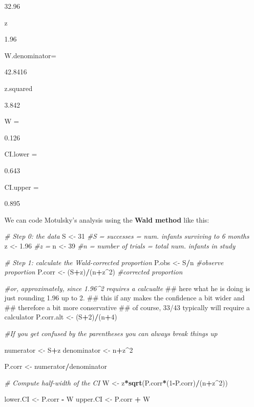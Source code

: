 \documentclass[]{book}
\newenvironment{Shaded}{\begin{snugshade}}{\end{snugshade}}
\newcommand{\KeywordTok}[1]{\textcolor[rgb]{0.13,0.29,0.53}{\textbf{#1}}}
\newcommand{\DecValTok}[1]{\textcolor[rgb]{0.00,0.00,0.81}{#1}}
\newcommand{\FloatTok}[1]{\textcolor[rgb]{0.00,0.00,0.81}{#1}}
\newcommand{\StringTok}[1]{\textcolor[rgb]{0.31,0.60,0.02}{#1}}
\newcommand{\CommentTok}[1]{\textcolor[rgb]{0.56,0.35,0.01}{\textit{#1}}}
\newcommand{\OperatorTok}[1]{\textcolor[rgb]{0.81,0.36,0.00}{\textbf{#1}}}
\newcommand{\NormalTok}[1]{#1}
\theoremstyle{definition}
\theoremstyle{definition}
\theoremstyle{definition}
\theoremstyle{remark}
\begin{document}
32.96

z

1.96

W.denominator=

42.8416

z.squared

3.842

W =

0.126

CI.lower =

0.643

CI.upper =

0.895

We can code Motulsky's analysis using the \textbf{Wald method} like
this:

\begin{Shaded}
\begin{Highlighting}[]
\CommentTok{# Step 0: the data}
\NormalTok{S <-}\StringTok{ }\DecValTok{31}   \CommentTok{#S = successes = num. infants surviving to 6 months}
\NormalTok{z <-}\StringTok{ }\FloatTok{1.96} \CommentTok{#z = }
\NormalTok{n <-}\StringTok{ }\DecValTok{39}   \CommentTok{#n = number of trials = total num. infants in study}

\CommentTok{# Step 1: calculate the Wald-corrected proportion}
\NormalTok{P.obs  <-}\StringTok{  }\NormalTok{S}\OperatorTok{/}\NormalTok{n           }\CommentTok{#observe proportion}
\NormalTok{P.corr <-}\StringTok{  }\NormalTok{(S}\OperatorTok{+}\NormalTok{z)}\OperatorTok{/}\NormalTok{(n}\OperatorTok{+}\NormalTok{z}\OperatorTok{^}\DecValTok{2}\NormalTok{) }\CommentTok{#corrected proportion}

\CommentTok{#or, approximately, since 1.96^2 requires a calcualte}
\NormalTok{## here what he is doing is just rounding 1.96 up to 2.}
\NormalTok{## this if any makes the confidence a bit wider and}
\NormalTok{## therefore a bit more conservative}
\NormalTok{## of course, 33/43 typically will require a calculator}
\NormalTok{P.corr.alt <-}\StringTok{  }\NormalTok{(S}\OperatorTok{+}\DecValTok{2}\NormalTok{)}\OperatorTok{/}\NormalTok{(n}\OperatorTok{+}\DecValTok{4}\NormalTok{)}

\CommentTok{#If you get confused by the parentheses you can always break things up}

\NormalTok{numerator <-}\StringTok{ }\NormalTok{S}\OperatorTok{+}\NormalTok{z}
\NormalTok{denominator <-}\StringTok{ }\NormalTok{n}\OperatorTok{+}\NormalTok{z}\OperatorTok{^}\DecValTok{2}

\NormalTok{P.corr <-}\StringTok{ }\NormalTok{numerator}\OperatorTok{/}\NormalTok{denominator}

\CommentTok{# Compute half-width of the CI}
\NormalTok{W <-}\StringTok{ }\NormalTok{z}\OperatorTok{*}\KeywordTok{sqrt}\NormalTok{(P.corr}\OperatorTok{*}\NormalTok{(}\DecValTok{1}\OperatorTok{-}\NormalTok{P.corr)}\OperatorTok{/}\NormalTok{(n}\OperatorTok{+}\NormalTok{z}\OperatorTok{^}\DecValTok{2}\NormalTok{))}

\NormalTok{lower.CI <-}\StringTok{ }\NormalTok{P.corr }\OperatorTok{-}\StringTok{ }\NormalTok{W}
\NormalTok{upper.CI <-}\StringTok{ }\NormalTok{P.corr }\OperatorTok{+}\StringTok{ }\NormalTok{W}
\end{Highlighting}
\end{Shaded}
\end{document}
